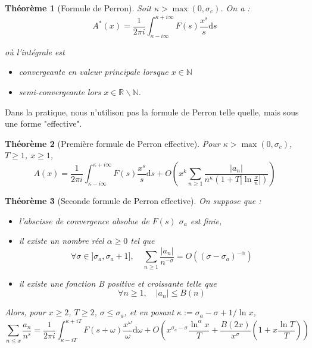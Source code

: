 \documentclass[french]{report}
\newtheorem{theorem}{Théorème}[section]
\begin{document}
\begin{theorem}[Formule de Perron]
  Soit $\kappa>\max(0,\sigma_c)$. On a :
  \[
    A^*(x) = \frac{1}{2\pi i}\int_{\kappa-i\infty}^{\kappa+i\infty}F(s)\frac{x^s}{s}\mathrm{d}s
  \]

  où l'intégrale est
  \begin{itemize}
    \item convergeante en valeur principale lorsque $x\in\mathbb{N}$
    \item semi-convergeante lors $x\in\mathbb{R}\backslash\mathbb{N}$.
  \end{itemize}
\end{theorem}

Dans la pratique, nous n'utilison pas la formule de Perron telle quelle, mais sous une forme "effective".

\begin{theorem}[Première formule de Perron effective]
  Pour $\kappa>\max(0,\sigma_c)$, $T\geq1$, $x\geq1$,
  \[ A(x) = \frac{1}{2\pi i}\int_{\kappa-i\infty}^{\kappa+i\infty}F(s)\frac{x^s}{s}\mathrm{d}s + O\left(x^k\sum_{n\geq1}\frac{|a_n|}{n^\kappa(1+T|\ln\frac{x}{n}|)}\right) \]
\end{theorem}

\begin{theorem}[Seconde formule de Perron effective]\label{eq:perron-2-effective}
  On suppose que :
  \begin{itemize}
    \item l'abscisse de convergence absolue de $F(s)$ $\sigma_a$ est finie,
    \item il existe un nombre réel $\alpha\geq0$ tel que
    \[ \forall\sigma\in]\sigma_a,\sigma_a+1],\quad\sum_{n\geq1}\frac{|a_n|}{n^{-\sigma}}=O((\sigma-\sigma_a)^{-\alpha}) \]
    \item il existe une fonction B positive et croissante telle que
    \[ \forall n\geq1,\quad|a_n|\leq B(n) \]
  \end{itemize}
  Alors, pour $x\geq2$, $T\geq2$, $\sigma\leq\sigma_a$, et en posant $\kappa:=\sigma_a-\sigma+1/\ln x$,
  \[ \sum_{n\leq x}\frac{a_n}{n^s}=\frac{1}{2\pi i}\int_{\kappa-iT}^{\kappa+iT}F(s+\omega)\frac{x^\omega}{\omega}\mathrm{d}\omega + O\left(x^{\sigma_a-\sigma}\frac{\ln^\alpha x}{T}+\frac{B(2x)}{x^\sigma}\left(1+x\frac{\ln T}{T}\right)\right) \]
\end{theorem}

\end{document}
